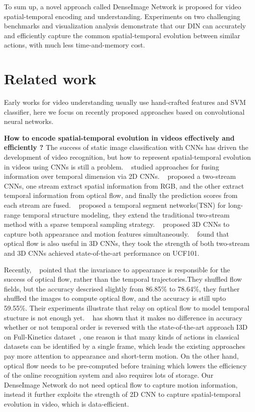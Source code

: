 \documentclass{article}
\begin{document}
To sum up, a novel approach called DenseImage Network is proposed for video spatial-temporal encoding and understanding. Experiments on two challenging benchmarks and visualization analysis demonstrate that our DIN can accurately and efficiently capture the common spatial-temporal evolution between similar actions, with much less time-and-memory cost.

\section{Related work}
Early works for video understanding usually use hand-crafted features and SVM classifier, here we focus on recently proposed approaches based on convolutional neural networks.

\textbf{How to encode spatial-temporal evolution in videos effectively and efficiently ?} The success of static image classification with CNNs has driven the development of video recognition, but how to represent spatial-temporal evolution in videos using CNNs is still a problem. ~\cite{KarpathyTSLSF14} studied approaches for fusing information over
temporal dimension via 2D CNNs. ~\cite{SimonyanZ14} proposed a two-stream CNNs, one stream extract spatial information from RGB, and the other extract temporal information from optical flow, and finally the prediction scores from each stream are fused. ~\cite{WangXW0LTG16} proposed a temporal segment networks(TSN) for long-range temporal structure modeling, they extend the traditional two-stream method with a sparse temporal sampling strategy. ~\cite{TranBFTP15} proposed 3D CNNs to capture both appearance and motion features simultaneously. ~\cite{CarreiraZ17} found that optical flow is also useful in 3D CNNs, they took the strength of both two-stream and 3D CNNs achieved state-of-the-art performance on UCF101.

Recently, ~\cite{abs-1712-08416} pointed that the invariance to appearance is responsible for the success of optical flow, rather than the temporal trajectories.They shuffled flow fields, but the accuracy descrised slightly from 86.85\% to 78.64\%, they further shuffled the images to compute optical flow, and the accuracy is still upto 59.55\%. Their experiments illustrate that relay on optical flow to model temporal stucture is not enough yet. ~\cite{abs-1712-04851} has shown that it makes no difference in accuracy whether or not temporal order is reversed with the state-of-the-art approach I3D on Full-Kinetics dataset~\cite{CarreiraZ17}, one reason is that many kinds of actions in classical datasets can be identified by a single frame, which leads the existing approaches pay more attention to appearance and short-term motion. On the other hand, optical flow needs to be pre-computed before training which lowers the efficiency of the online recognition system and also requires lots of storage. Our DenseImage Network do not need optical flow to capture motion information, instead it further exploits the strength of 2D CNN to capture spatial-temporal evolution in video, which is data-efficient.
\end{document}
